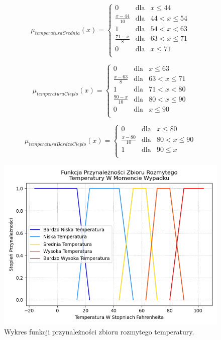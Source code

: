 \documentclass{classrep}
\begin{document}
\begin{equation}
\mu _{temperaturaSrednia}(x) =  \left\{ \begin{array}{rcl}
 0 & \mbox{dla} & x  \leq 44 \\
\frac{x - 44}{10} & \mbox{dla} & 44 < x \leq 54\\
1 & \mbox{dla} & 54 < x < 63\\
\frac{71 - x}{8} & \mbox{dla} & 63 < x \leq 71\\
 0 & \mbox{dla} & x  \leq 71 \\
\end{array}\right.
\end{equation}

\begin{equation}
\mu _{temperaturaCieplo}(x) =  \left\{ \begin{array}{rcl}
 0 & \mbox{dla} & x  \leq 63 \\
\frac{x - 63}{8} & \mbox{dla} & 63 < x \leq 71\\
1 & \mbox{dla} & 71 < x < 80\\
\frac{90 - x}{10} & \mbox{dla} & 80 < x \leq 90\\
 0 & \mbox{dla} & x  \leq 90 \\
\end{array}\right.
\end{equation}

\begin{equation}
\mu _{temperaturaBardzoCieplo}(x) =  \left\{ \begin{array}{rcl}
 0 & \mbox{dla} & x \leq 80 \\
\frac{x - 80}{10} & \mbox{dla} & 80 < x \leq 90\\
1 & \mbox{dla} & 90 \leq x\\
\end{array}\right.
\end{equation}

\newpage

\begin{figure}[h!]
 \centering
 \includegraphics[width=14cm]{FunkcjaPrzynaleznosciTemperatura.png}
 \vspace{-0.3cm}
 \caption{Wykres funkcji przynależności zbioru rozmytego temperatury. }
 \label{rysunek do eksperymentu 1 wariantu 1}
\end{figure}
\newpage
\end{document}

